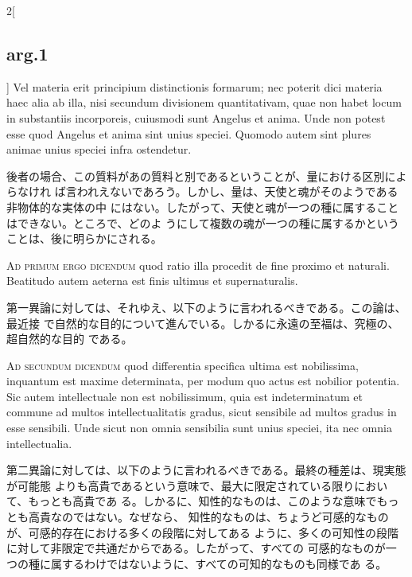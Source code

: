 \documentclass[paper=a4paper,fontsize=10pt,jafontsize=9pt,titlepage]{jlreq}
\begin{document}
\begin{paracol}{2}[\subsection{arg.1}]
 Vel materia erit principium distinctionis formarum; nec poterit dici materia
 haec alia ab illa, nisi secundum divisionem quantitativam, quae non habet locum
 in substantiis incorporeis, cuiusmodi sunt Angelus et anima. Unde non potest
 esse quod Angelus et anima sint unius speciei. Quomodo autem sint plures animae
 unius speciei infra ostendetur.

\switchcolumn

後者の場合、この質料があの質料と別であるということが、量における区別によらなけれ
ば言われえないであろう。しかし、量は、天使と魂がそのようである非物体的な実体の中
にはない。したがって、天使と魂が一つの種に属することはできない。ところで、どのよ
うにして複数の魂が一つの種に属するかということは、後に明らかにされる。
 
\switchcolumn*[\subsection{ad 1}]

{\scshape Ad primum ergo dicendum} quod ratio illa procedit de fine proximo et
 naturali. Beatitudo autem aeterna est finis ultimus et supernaturalis.

\switchcolumn

 第一異論に対しては、それゆえ、以下のように言われるべきである。この論は、最近接
 で自然的な目的について進んでいる。しかるに永遠の至福は、究極の、超自然的な目的
 である。
 
\switchcolumn*[\subsection{ad 2}]

{\scshape Ad secundum dicendum} quod differentia specifica ultima est
 nobilissima, inquantum est maxime determinata, per modum quo actus est nobilior
 potentia. Sic autem intellectuale non est nobilissimum, quia est indeterminatum
 et commune ad multos intellectualitatis gradus, sicut sensibile ad multos
 gradus in esse sensibili. Unde sicut non omnia sensibilia sunt unius speciei,
 ita nec omnia intellectualia.

\switchcolumn

第二異論に対しては、以下のように言われるべきである。最終の種差は、現実態が可能態
よりも高貴であるという意味で、最大に限定されている限りにおいて、もっとも高貴であ
る。しかるに、知性的なものは、このような意味でもっとも高貴なのではない。なぜなら、
知性的なものは、ちょうど可感的なものが、可感的存在における多くの段階に対してある
ように、多くの可知性の段階に対して非限定で共通だからである。したがって、すべての
可感的なものが一つの種に属するわけではないように、すべての可知的なものも同様であ
る。
 

\end{paracol}
\end{document}
